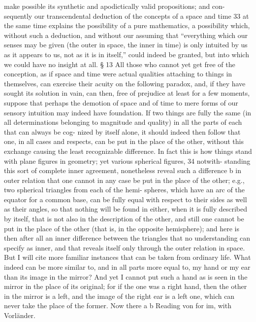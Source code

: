 make possible its synthetic and apodictically valid propositions; and con-
sequently our transcendental deduction of the concepts of a space and
time 33 at the same time explains the possibility of a pure mathematics, a
possibility which, without such a deduction, and without our assuming
that “everything which our senses may be given (the outer in space, the
inner in time) is only intuited by us as it appears to us, not as it is in itself,”
could indeed be granted, but into which we could have no insight at all.
§ 13
All those who cannot yet get free of the conception, as if space and time
were actual qualities attaching to things in themselves, can exercise their
acuity on the following paradox, and, if they have sought its solution in
vain, can then, free of prejudice at least for a few moments, suppose that
perhaps the demotion of space and of time to mere forms of our sensory
intuition may indeed have foundation.
If two things are fully the same (in all determinations belonging to
magnitude and quality) in all the parts of each that can always be cog-
nized by itself alone, it should indeed then follow that one, in all cases
and respects, can be put in the place of the other, without this exchange
causing the least recognizable difference. In fact this is how things stand
with plane ﬁgures in geometry; yet various spherical ﬁgures, 34 notwith-
standing this sort of complete inner agreement, nonetheless reveal such
a difference b in outer relation that one cannot in any case be put in the
place of the other; e.g., two spherical triangles from each of the hemi-
spheres, which have an arc of the equator for a common base, can be fully
equal with respect to their sides as well as their angles, so that nothing
will be found in either, when it is fully described by itself, that is not also
in the description of the other, and still one cannot be put in the place
of the other (that is, in the opposite hemisphere); and here is then after
all an inner difference between the triangles that no understanding can
specify as inner, and that reveals itself only through the outer relation
in space. But I will cite more familiar instances that can be taken from
ordinary life.
What indeed can be more similar to, and in all parts more equal to, my
hand or my ear than its image in the mirror? And yet I cannot put such a
hand as is seen in the mirror in the place of its original; for if the one was a
right hand, then the other in the mirror is a left, and the image of the right
ear is a left one, which can never take the place of the former. Now there
a
b
Reading von for im, with Vorländer.
